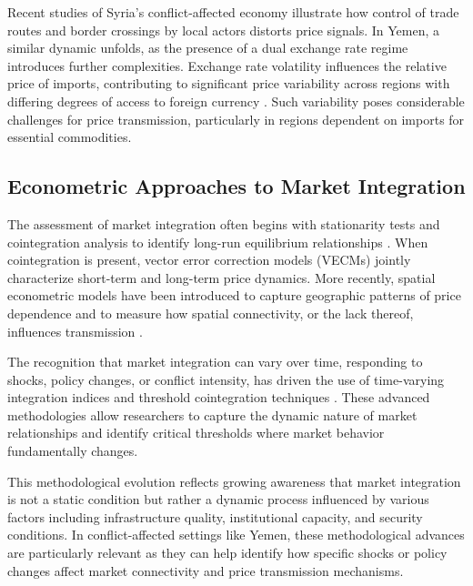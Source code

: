 Recent studies of Syria's conflict-affected economy \citep{mansour2021market} illustrate how control of trade routes and border crossings by local actors distorts price signals. In Yemen, a similar dynamic unfolds, as the presence of a dual exchange rate regime introduces further complexities. Exchange rate volatility influences the relative price of imports, contributing to significant price variability across regions with differing degrees of access to foreign currency \citep{worldbank2022yemen}. Such variability poses considerable challenges for price transmission, particularly in regions dependent on imports for essential commodities.

\subsection{Econometric Approaches to Market Integration}
The assessment of market integration often begins with stationarity tests and cointegration analysis to identify long-run equilibrium relationships \citep{engle1987cointegration, johansen1988statistical}. When cointegration is present, vector error correction models (VECMs) jointly characterize short-term and long-term price dynamics. More recently, spatial econometric models have been introduced to capture geographic patterns of price dependence and to measure how spatial connectivity, or the lack thereof, influences transmission \citep{anselin1988spatial, fackler2001spatial}.

The recognition that market integration can vary over time, responding to shocks, policy changes, or conflict intensity, has driven the use of time-varying integration indices and threshold cointegration techniques \citep{hansen2002testing}. These advanced methodologies allow researchers to capture the dynamic nature of market relationships and identify critical thresholds where market behavior fundamentally changes.

This methodological evolution reflects growing awareness that market integration is not a static condition but rather a dynamic process influenced by various factors including infrastructure quality, institutional capacity, and security conditions. In conflict-affected settings like Yemen, these methodological advances are particularly relevant as they can help identify how specific shocks or policy changes affect market connectivity and price transmission mechanisms.
